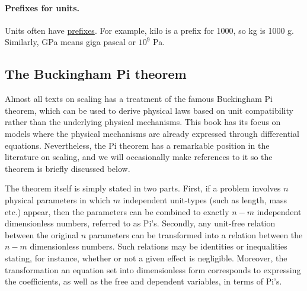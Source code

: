 \documentclass[graybox,envcountchap,sectrefs,final]{svmonodo}
\begin{document}
\noindent
\paragraph{Prefixes for units.}
Units often have \href{{https://en.wikipedia.org/wiki/Metric_prefix}}{prefixes}.
For example, kilo is a prefix for 1000,
so kg is 1000 g. Similarly, GPa means giga pascal or $10^9$ Pa.

\subsection{The Buckingham Pi theorem}
\label{scale:dimunit:Pi}


Almost all texts on scaling has a treatment of the famous Buckingham Pi
theorem, which can be used to derive physical laws based on
unit compatibility rather than the underlying physical mechanisms.
This book has its focus on models where the physical mechanisms are
already expressed through differential equations. Nevertheless, the Pi
theorem has a remarkable position in the literature on scaling, and we
will occasionally make references to it so the theorem is briefly
discussed below.

The theorem itself is simply stated in two parts. First, if a problem
involves $n$ physical parameters in which $m$ independent unit-types
(such as length, mass etc.) appear, then the parameters can be
combined to exactly $n-m$ independent dimensionless numbers, referred
to as Pi's. Secondly, any unit-free relation between the original $n$
parameters can be transformed into a relation between the $n-m$
dimensionless numbers.  Such relations may be identities or
inequalities stating, for instance, whether or not a given effect is
negligible. Moreover, the transformation an equation set into
dimensionless form corresponds to expressing the coefficients, as well
as the free and dependent variables, in terms of Pi's.
\end{document}
